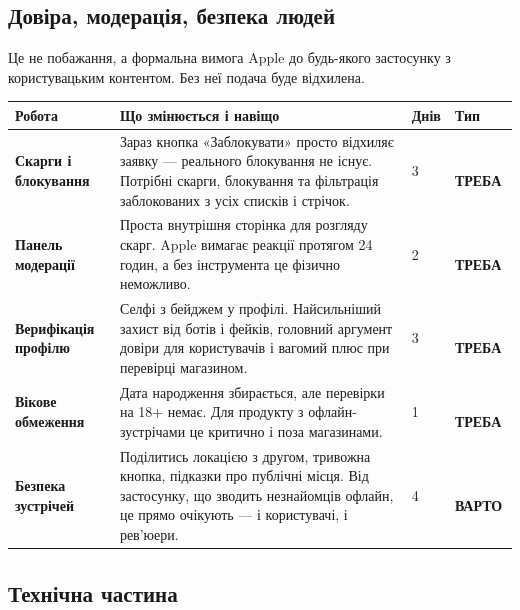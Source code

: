 \documentclass[11pt,a4paper]{article}
\newcommand{\thead}[1]{{\color{muted}\footnotesize\bfseries #1}}
\newcommand{\must}{\colorbox{criticalsoft}{\color{critical}\scriptsize\bfseries\,ТРЕБА\,}}
\newcommand{\rec}{\colorbox{accentsoft}{\color{accent}\scriptsize\bfseries\,ВАРТО\,}}
\begin{document}
\subsection{Довіра, модерація, безпека людей }

Це не побажання, а формальна вимога Apple до будь-якого застосунку з
користувацьким контентом. Без неї подача буде відхилена.

\begin{xltabular}{\textwidth}{N{3.7cm} Y R{1.1cm} L{1.5cm}}
\toprule
\thead{Робота} & \thead{Що змінюється і навіщо} & \thead{Днів} & \thead{Тип} \\
\midrule

\textbf{Скарги і блокування} &
Зараз кнопка «Заблокувати» просто відхиляє заявку --- реального блокування не
існує. Потрібні скарги, блокування та фільтрація заблокованих з усіх списків
і стрічок. & 3 & \must \\

\textbf{Панель модерації} &
Проста внутрішня сторінка для розгляду скарг. Apple вимагає реакції протягом
24 годин, а без інструмента це фізично неможливо. & 2 & \must \\

\textbf{Верифікація профілю} &
Селфі з бейджем у профілі. Найсильніший захист від ботів і фейків, головний
аргумент довіри для користувачів і вагомий плюс при перевірці магазином. & 3 & \must \\

\textbf{Вікове обмеження} &
Дата народження збирається, але перевірки на 18+ немає. Для продукту з
офлайн-зустрічами це критично і поза магазинами. & 1 & \must \\

\textbf{Безпека зустрічей} &
Поділитись локацією з другом, тривожна кнопка, підказки про публічні місця.
Від застосунку, що зводить незнайомців офлайн, це прямо очікують --- і
користувачі, і рев'юери. & 4 & \rec \\

\bottomrule
\end{xltabular}

\subsection{Технічна частина }
\end{document}
